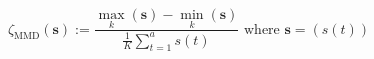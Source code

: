 \begin{equation}
	\zeta_\text{MMD}(\textbf{s}) := \frac{\max_k \left(\textbf{s}\right) - \min_k\left(\textbf{s}\right)}{\frac{1}{K}\sum_{t=1}^{a}s(t)}
	\text{ where } \textbf{s} = (s(t))
\label{ch1:equ:min-max-difference-definition}
\end{equation}